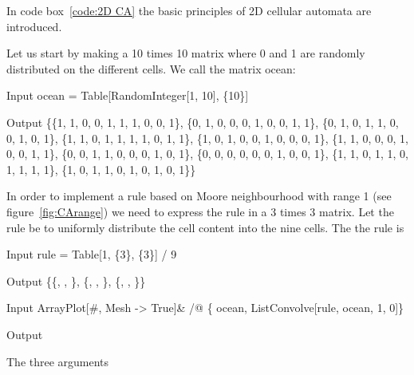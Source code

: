 \documentclass[11pt,fleqn]{book} %
\begin{document}
In code box~\ref{code:2D CA} the basic principles of 2D cellular automata are introduced.

\begin{theorem}
\hfill \break
Let us start by making a 10 times 10 matrix where 0 and 1 are randomly distributed on the different cells. We call the matrix ocean:
\begin{mmaCell}[index=1]{Input}
  ocean = Table[RandomInteger[1, 10], \{10\}]
\end{mmaCell}
\begin{mmaCell}{Output}
  \{\{1, 1, 0, 0, 1, 1, 1, 0, 0, 1\}, \{0, 1, 0, 0, 0, 1, 0, 0, 1, 1\}, 
  \{0, 1, 0, 1, 1, 0, 0, 1, 0, 1\}, \{1, 1, 0, 1, 1, 1, 1, 0, 1, 1\}, 
  \{1, 0, 1, 0, 0, 1, 0, 0, 0, 1\}, \{1, 1, 0, 0, 0, 1, 0, 0, 1, 1\}, 
  \{0, 0, 1, 1, 0, 0, 0, 1, 0, 1\}, \{0, 0, 0, 0, 0, 0, 1, 0, 0, 1\}, 
  \{1, 1, 0, 1, 1, 0, 1, 1, 1, 1\}, \{1, 0, 1, 1, 0, 1, 0, 1, 0, 1\}\}
\end{mmaCell}
In order to implement a rule based on Moore neighbourhood with range 1 (see figure~\ref{fig:CArange}) we need to express the rule in a 3 times 3 matrix. Let the rule be to uniformly distribute the cell content into the nine cells. The the rule is
\begin{mmaCell}{Input}
  rule = Table[1, \{3\}, \{3\}] / 9
\end{mmaCell}
\begin{mmaCell}{Output}
  \Big\{\Big\{, , \Big\}, \Big\{, , \Big\}, \Big\{, , \Big\}\Big\}
\end{mmaCell}
\begin{mmaCell}{Input}
  ArrayPlot[#, Mesh -> True]& /@ \{
    ocean, ListConvolve[rule, ocean, 1, 0]\}
\end{mmaCell}
\begin{mmaCell}[moregraphics={moreig={scale=.5}}]{Output}
\end{mmaCell}
The three arguments

\end{theorem}
\end{document}
